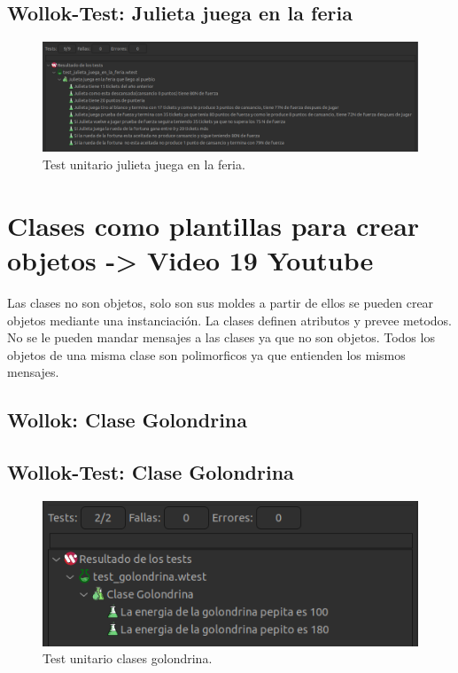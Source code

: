 \documentclass[11pt,a4paper]{article}
\begin{document}
\subsection{Wollok-Test: Julieta juega en la feria}


\begin{figure}[H]
	\centering
	\includegraphics[scale=0.4]{figuras/test_julieta_juega_en_la_feria.png}
    \caption{Test unitario julieta juega en la feria.}
    \label{fig:test julieta juega en la feria}
\end{figure}  

\newpage
\section{Clases como plantillas para crear objetos -> Video 19 Youtube}

Las clases no son objetos, solo son sus moldes a partir de ellos se pueden crear objetos mediante una instanciación.
La clases definen atributos y prevee metodos. No se le pueden mandar mensajes a las clases ya que no son objetos.
Todos los objetos de una misma clase son polimorficos ya que entienden los mismos mensajes.

\subsection{Wollok: Clase Golondrina}


\subsection{Wollok-Test: Clase Golondrina}


\begin{figure}[H]
	\centering
	\includegraphics[scale=0.4]{figuras/test_clase_golondrina.png}
    \caption{Test unitario clases golondrina.}
    \label{fig:test clase golondrina}
\end{figure} 
\end{document}
